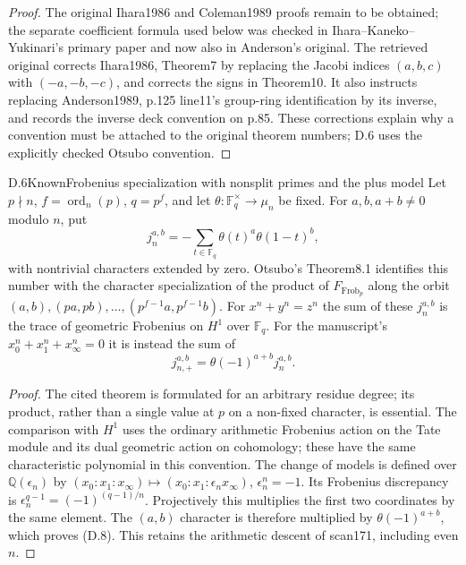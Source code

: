 \begin{proof}
The original Ihara1986 and Coleman1989 proofs remain to be obtained; the separate coefficient formula used below was checked in Ihara--Kaneko--Yukinari's primary paper and now also in Anderson's original. The retrieved original \cite[Supplement]{dIhara2000} corrects Ihara1986, Theorem7 by replacing the Jacobi indices $(a,b,c)$ with $(-a,-b,-c)$, and corrects the signs in Theorem10. It also instructs replacing Anderson1989, p.125 line11's group-ring identification by its inverse, and records the inverse deck convention on p.85. These corrections explain why a convention must be attached to the original theorem numbers; D.6 uses the explicitly checked Otsubo convention.
\end{proof}

\begin{statement}{D.6}{Known}{Frobenius specialization with nonsplit primes and the plus model}
Let $p\nmid n$, $f=\operatorname{ord}_n(p)$, $q=p^f$, and let $\theta:\mathbb F_q^\times\to\mu_n$ be fixed. For $a,b,a+b\ne0$ modulo $n$, put
\[
 j_n^{a,b}=-\sum_{t\in\mathbb F_q}\theta(t)^a\theta(1-t)^b,
\]
with nontrivial characters extended by zero. Otsubo's Theorem8.1 identifies this number with the character specialization of the product of $F_{\operatorname{Frob}_p}$ along the orbit
$(a,b),(pa,pb),\ldots,(p^{f-1}a,p^{f-1}b)$. For $x^n+y^n=z^n$ the sum of these $j_n^{a,b}$ is the trace of geometric Frobenius on $H^1$ over $\mathbb F_q$. For the manuscript's $x_0^n+x_1^n+x_\infty^n=0$ it is instead the sum of
\[
 j_{n,+}^{a,b}=\theta(-1)^{a+b}j_n^{a,b}.                    \tag{D.8}
\]
\end{statement}
\begin{proof}
The cited theorem \cite[Theorem8.1]{Otsubo2016} is formulated for an arbitrary residue degree; its product, rather than a single value at $p$ on a non-fixed character, is essential. The comparison with $H^1$ uses the ordinary arithmetic Frobenius action on the Tate module and its dual geometric action on cohomology; these have the same characteristic polynomial in this convention. The change of models is defined over $\mathbb Q(\epsilon_n)$ by
$(x_0:x_1:x_\infty)\mapsto(x_0:x_1:\epsilon_n x_\infty)$, $\epsilon_n^n=-1$. Its Frobenius discrepancy is $\epsilon_n^{q-1}=(-1)^{(q-1)/n}$. Projectively this multiplies the first two coordinates by the same element. The $(a,b)$ character is therefore multiplied by $\theta(-1)^{a+b}$, which proves (D.8). This retains the arithmetic descent of scan171, including even $n$.
\end{proof}

